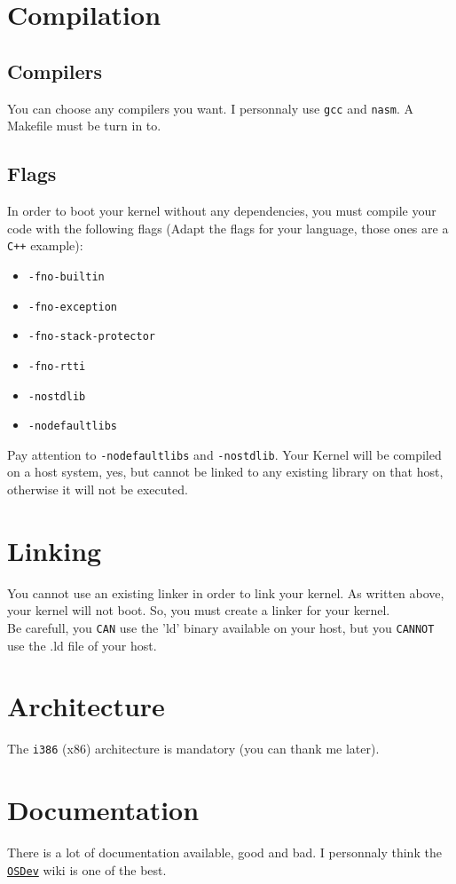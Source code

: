\documentclass{42-en}
\begin{document}
\newpage


	\section{Compilation}
		\subsection{Compilers}
			You can choose any compilers you want. I personnaly use	\texttt{gcc}
			and \texttt{nasm}. A Makefile must be turn in to.
		\subsection{Flags}
			In order to boot your kernel without any dependencies, you must compile
			your code with the following flags (Adapt the flags for your language,
			those ones are a \texttt{C++} example):
			\begin{itemize}\itemsep1pt
				\item \texttt{-fno-builtin}
				\item \texttt{-fno-exception}
				\item \texttt{-fno-stack-protector}
				\item \texttt{-fno-rtti}
				\item \texttt{-nostdlib}
				\item \texttt{-nodefaultlibs}
			\end{itemize}
			Pay attention to \texttt{-nodefaultlibs} and \texttt{-nostdlib}.
			Your Kernel will be compiled on a host system, yes, but cannot be
			linked to any existing library on that host, otherwise it will not
			be executed.
	\section{Linking}
		You cannot use an existing linker in order to link your kernel.
		As written above, your kernel will not boot. So, you must create a linker
		for your kernel.\\
		Be carefull, you \texttt{CAN} use the 'ld' binary available on your host,
		but you \texttt{CANNOT} use the .ld file of your host.
	\section{Architecture}
		The \texttt{i386} (x86) architecture is mandatory
		(you can thank me later).
	\section{Documentation}
		There is a lot of documentation available, good and bad.
		I personnaly think the \texttt{\href{http://wiki.osdev.org/Main_Page}
		{OSDev}} wiki is one of the best.
\end{document}
